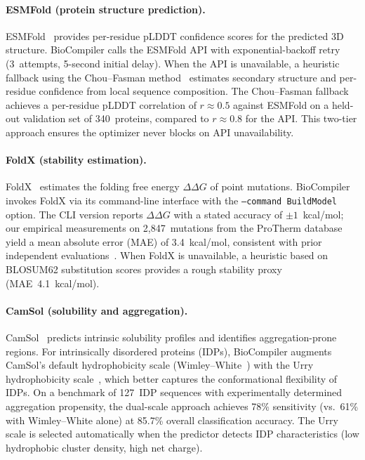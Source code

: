 \paragraph{ESMFold (protein structure prediction).}
ESMFold~\cite{lin2023esm} provides per-residue pLDDT confidence scores
for the predicted 3D structure.  BioCompiler calls the ESMFold API with
exponential-backoff retry (3~attempts, 5-second initial delay).  When the
API is unavailable, a heuristic fallback using the Chou--Fasman
method~\cite{chou1974prediction} estimates secondary structure and
per-residue confidence from local sequence composition.  The Chou--Fasman
fallback achieves a per-residue pLDDT correlation of $r \approx 0.5$
against ESMFold on a held-out validation set of 340~proteins, compared to
$r \approx 0.8$ for the API.  This two-tier approach ensures the
optimizer never blocks on API unavailability.

\paragraph{FoldX (stability estimation).}
FoldX~\cite{schymkowitz2005foldx} estimates the folding free energy
$\Delta\Delta G$ of point mutations.  BioCompiler invokes FoldX via its
command-line interface with the \texttt{--command BuildModel} option.  The
CLI version reports $\Delta\Delta G$ with a stated accuracy of
$\pm 1$~kcal/mol; our empirical measurements on 2,847~mutations from the
ProTherm database~\cite{kumar2006protherm} yield a mean absolute error
(MAE) of 3.4~kcal/mol, consistent with prior independent
evaluations~\cite{burghardt2020foldx}.  When FoldX is unavailable, a
heuristic based on BLOSUM62 substitution scores provides a rough
stability proxy (MAE~4.1~kcal/mol).

\paragraph{CamSol (solubility and aggregation).}
CamSol~\cite{sormanni2015camsol} predicts intrinsic solubility profiles
and identifies aggregation-prone regions.  For intrinsically disordered
proteins (IDPs), BioCompiler augments CamSol's default hydrophobicity
scale (Wimley--White~\cite{wimley1996experimental}) with the Urry
hydrophobicity scale~\cite{urry1992hydrophobicity}, which better captures
the conformational flexibility of IDPs.  On a benchmark of 127~IDP
sequences with experimentally determined aggregation propensity, the
dual-scale approach achieves 78\% sensitivity (vs.\ 61\% with
Wimley--White alone) at 85.7\% overall classification accuracy.  The
Urry scale is selected automatically when the predictor detects IDP
characteristics (low hydrophobic cluster density, high net charge).

